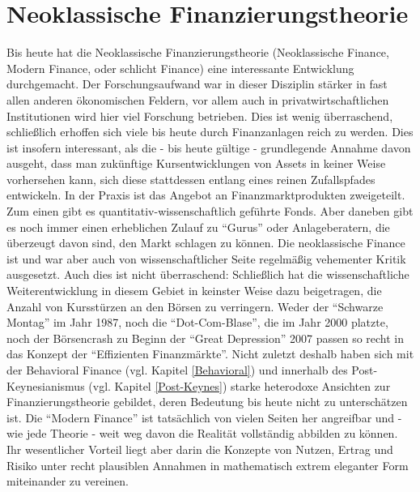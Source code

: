%
%
%

\chapter{Neoklassische Finanzierungstheorie}
\label{Finance}

Bis heute hat die Neoklassische Finanzierungstheorie (Neoklassische Finance, Modern Finance, oder schlicht Finance) eine interessante Entwicklung durchgemacht. Der Forschungsaufwand war in dieser Disziplin stärker in fast allen anderen ökonomischen Feldern, vor allem auch in privatwirtschaftlichen Institutionen wird hier viel Forschung betrieben. Dies ist wenig überraschend, schließlich erhoffen sich viele bis heute durch Finanzanlagen reich zu werden. Dies ist insofern interessant, als die - bis heute gültige - grundlegende Annahme davon ausgeht, dass man zukünftige Kursentwicklungen von Assets in keiner Weise vorhersehen kann, sich diese stattdessen entlang eines reinen Zufallspfades entwickeln. In der Praxis ist das Angebot an Finanzmarktprodukten zweigeteilt. Zum einen gibt es quantitativ-wissenschaftlich geführte Fonds. Aber daneben gibt es noch immer einen erheblichen Zulauf zu "`Gurus"' oder Anlageberatern, die überzeugt davon sind, den Markt schlagen zu können. Die neoklassische Finance ist und war aber auch von wissenschaftlicher Seite regelmäßig vehementer Kritik ausgesetzt. Auch dies ist nicht überraschend: Schließlich hat die wissenschaftliche Weiterentwicklung in diesem Gebiet in keinster Weise dazu beigetragen, die Anzahl von Kursstürzen an den Börsen zu verringern. Weder der "`Schwarze Montag"' im Jahr 1987, noch die "`Dot-Com-Blase"', die im Jahr 2000 platzte, noch der Börsencrash zu Beginn der "`Great Depression"' 2007 passen so recht in das Konzept der "`Effizienten Finanzmärkte"'. Nicht zuletzt deshalb haben sich mit der Behavioral Finance (vgl. Kapitel \ref{Behavioral}) und innerhalb des Post-Keynesianismus (vgl. Kapitel \ref{Post-Keynes}) starke heterodoxe Ansichten zur Finanzierungstheorie gebildet, deren Bedeutung bis heute nicht zu unterschätzen ist. Die "`Modern Finance"' ist tatsächlich von vielen Seiten her angreifbar und - wie jede Theorie - weit weg davon die Realität vollständig abbilden zu können. Ihr wesentlicher Vorteil liegt aber darin die Konzepte von Nutzen, Ertrag und Risiko unter recht plausiblen Annahmen in mathematisch extrem eleganter Form miteinander zu vereinen. 


